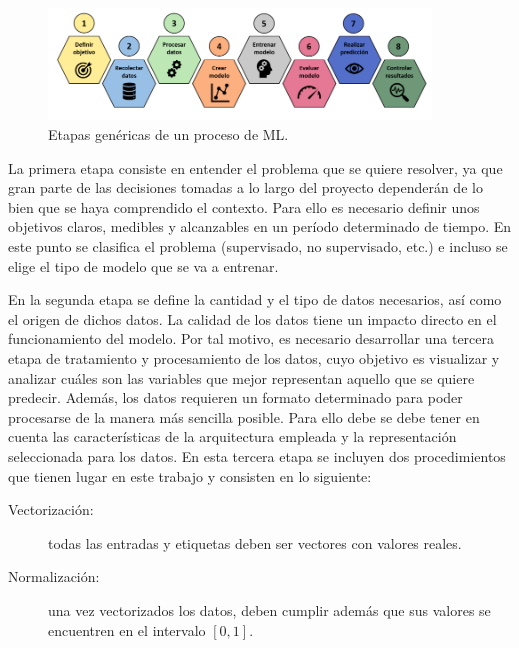   \begin{figure}[!h]
 	\centering
 	
 	\includegraphics[width=4in]{Graphics/etapasML.png}
 	
 	\caption{ \small{Etapas genéricas de un proceso de ML.}}
 	
 	\label{etapasML}
 	
 \end{figure}

La primera etapa consiste en entender el problema que se quiere resolver, ya que gran parte de las decisiones tomadas a lo largo del proyecto dependerán de lo bien que se haya comprendido el contexto. Para ello es necesario definir unos objetivos claros, medibles y alcanzables en un período determinado de tiempo. En este punto se clasifica el problema (supervisado, no supervisado, etc.) e incluso se elige el tipo de modelo que se va a entrenar.

En la segunda etapa se define la cantidad y el tipo de datos necesarios, así como el origen de dichos datos. La calidad de los datos tiene un impacto directo en el funcionamiento del modelo. Por tal motivo, es necesario desarrollar una tercera etapa de tratamiento y procesamiento de los datos, cuyo objetivo es visualizar y analizar cuáles son las variables que mejor representan aquello que se quiere predecir. Además, los datos requieren un formato determinado para poder procesarse de la manera más sencilla posible. Para ello debe se debe tener en cuenta las características de la arquitectura empleada y la representación seleccionada para los datos. En esta tercera etapa se incluyen dos procedimientos que tienen lugar en este trabajo y consisten en lo siguiente: 
	
	\begin{description}
		\item[Vectorización:] todas las entradas y etiquetas deben ser vectores con valores reales.
		
		\item[Normalización:] una vez vectorizados los datos, deben cumplir además que sus valores se encuentren en el intervalo $[0, 1]$.
	\end{description}

